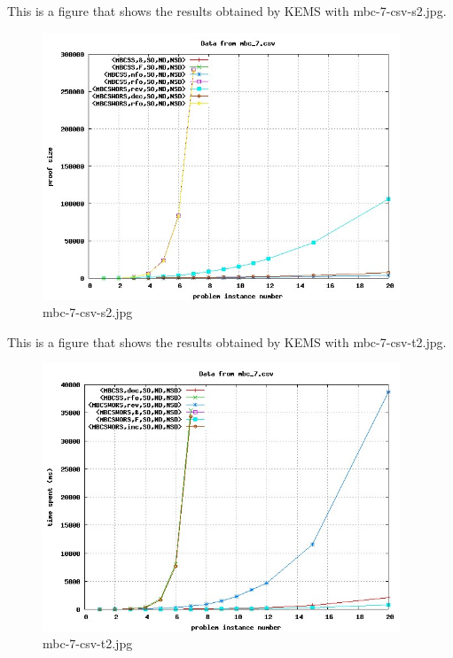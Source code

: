 This is a figure that shows the results obtained by KEMS with mbc-7-csv-s2.jpg.
\begin{figure}[htbp]
\begin{center}
\includegraphics[width=0.95\textwidth]{figuras/mbc-7-csv-s2.jpg}
\end{center}
\caption{mbc-7-csv-s2.jpg}
\end{figure}

This is a figure that shows the results obtained by KEMS with mbc-7-csv-t2.jpg.
\begin{figure}[htbp]
\begin{center}
\includegraphics[width=0.95\textwidth]{figuras/mbc-7-csv-t2.jpg}
\end{center}
\caption{mbc-7-csv-t2.jpg}
\end{figure}

